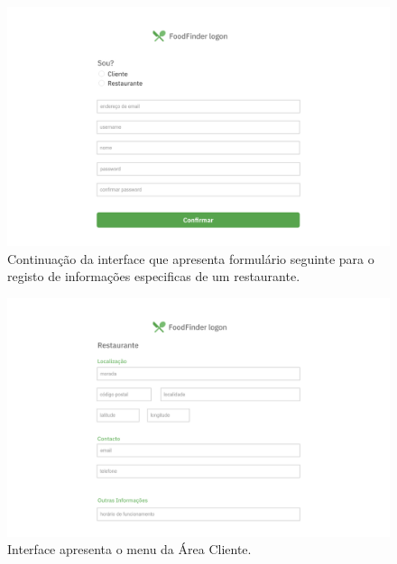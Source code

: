\documentclass[a4paper,12pt]{report}
\begin{document}
	\begin{figure}[H]
	\begin{center}
	\includegraphics[scale=0.25]{4.1-Screen10}	
	\end{center}
	\caption{Continuação da interface que apresenta formulário seguinte para o registo de informações especificas de um restaurante.}
	\end{figure} 
	
	\begin{figure}[H]
	\begin{center}
	\includegraphics[scale=0.25]{5.1-Screen11}	
	\end{center}
	\caption{Interface apresenta o menu da Área Cliente.}
	\end{figure} 
\end{document}
